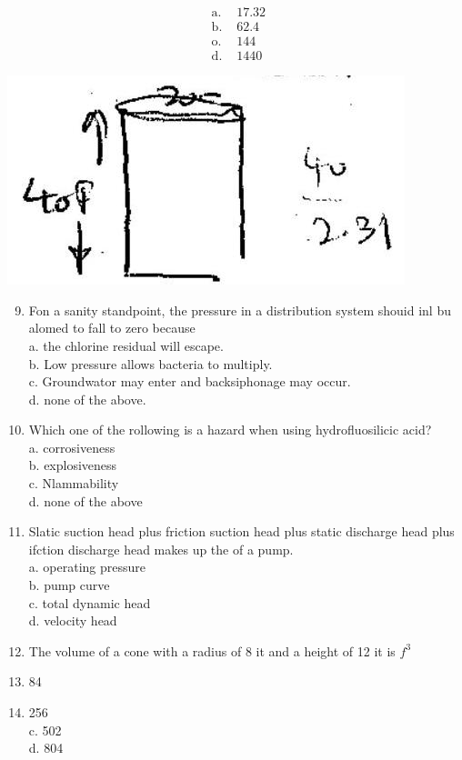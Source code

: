 \documentclass[10pt]{article}
\begin{document}
$$
\begin{array}{ll}
\text { a. } & 17.32 \\
\text { b. } & 62.4 \\
\text { o. } & 144 \\
\text { d. } & 1440
\end{array}
$$

\includegraphics[max width=\textwidth]{2022_11_11_ca6a6c1a0324ee23e523g-02(2)}

\begin{enumerate}
  \setcounter{enumi}{8}
  \item Fon a sanity standpoint, the pressure in a distribution system shouid inl bu alomed to fall to zero because\\
a. the chlorine residual will escape.\\
b. Low pressure allows bacteria to multiply.\\
c. Groundwator may enter and backsiphonage may occur.\\
d. none of the above.

  \item Which one of the rollowing is a hazard when using hydrofluosilicic acid?\\
a. corrosiveness\\
b. explosiveness\\
c. Nlammability\\
d. none of the above

  \item Slatic suction head plus friction suction head plus static discharge head plus ifction discharge head makes up the of a pump.\\
a. operating pressure\\
b. pump curve\\
c. total dynamic head\\
d. velocity head

  \item The volume of a cone with a radius of 8 it and a height of 12 it is $f^{3}$

  \item 84

  \item 256\\
c. 502\\
d. 804

\end{enumerate}
\end{document}
